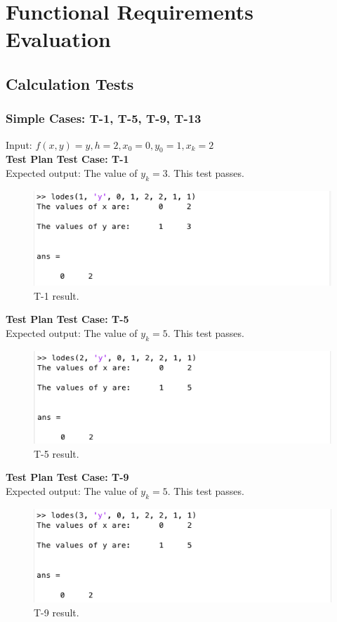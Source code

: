 \documentclass[12pt, titlepage]{article}
\begin{document}
\newpage

\section{Functional Requirements Evaluation} \label{sec_fr}
\subsection{Calculation Tests}
\subsubsection{Simple Cases: T-1, T-5, T-9, T-13}
Input: $f(x,y) = y, h = 2,x_0 = 0,y_0 = 1,x_k = 2$\\

\textbf{Test Plan Test Case: T-1}\\
Expected output: The value of $y_k = 3$. This test passes.\\
\begin{figure}[H]
 \includegraphics[width=\linewidth]{images/T1}
  \caption{T-1 result.}
  \label{fig:T1}
\end{figure}

\textbf{Test Plan Test Case: T-5}\\
Expected output: The value of $y_k = 5$. This test passes.\\
\begin{figure}[H]
 \includegraphics[width=\linewidth]{images/T5}
  \caption{T-5 result.}
  \label{fig:T5}
\end{figure}

\textbf{Test Plan Test Case: T-9}\\
Expected output: The value of $y_k = 5$. This test passes.\\
\begin{figure}[H]
 \includegraphics[width=\linewidth]{images/T9}
  \caption{T-9 result.}
  \label{fig:T9}
\end{figure}
\end{document}
